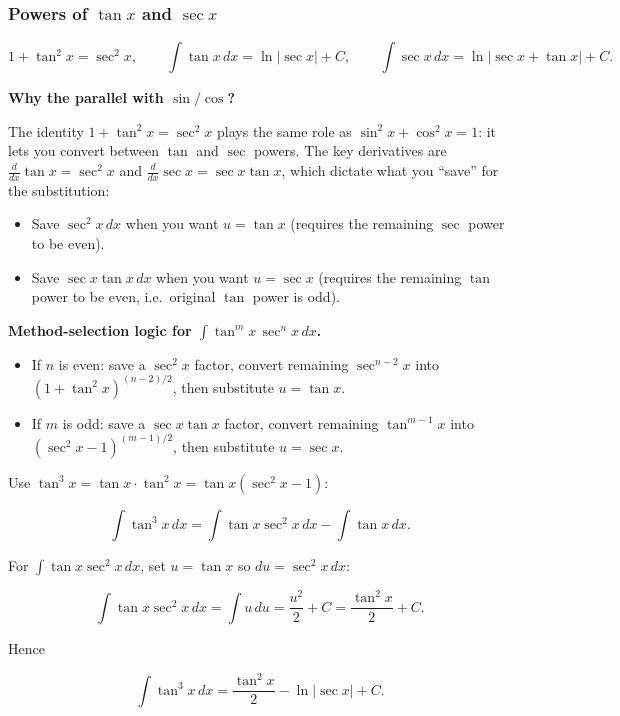 \subsubsection*{Powers of $\tan x$ and $\sec x$}

\begin{keyformula}[title={Key Formula: Core identity for $\tan/\sec$}]

\[
1+\tan^2x=\sec^2x,\qquad
\int \tan x\,dx=\ln|\sec x|+C,\qquad
\int \sec x\,dx=\ln|\sec x+\tan x|+C.
\]

\end{keyformula}

\textbf{Why the parallel with $\sin/\cos$?}

The identity $1+\tan^2x=\sec^2x$ plays the same role as $\sin^2x+\cos^2x=1$: it lets you convert between $\tan$ and $\sec$ powers. The key derivatives are $\frac{d}{dx}\tan x=\sec^2x$ and $\frac{d}{dx}\sec x=\sec x\tan x$, which dictate what you ``save'' for the substitution:

\begin{itemize}[leftmargin=*]
\item Save $\sec^2x\,dx$ when you want $u=\tan x$ (requires the remaining $\sec$ power to be even).
\item Save $\sec x\tan x\,dx$ when you want $u=\sec x$ (requires the remaining $\tan$ power to be even, i.e.\ original $\tan$ power is odd).
\end{itemize}

\noindent
\textbf{Method-selection logic for $\int \tan^m x\,\sec^n x\,dx$.}

\begin{itemize}
\item If $n$ is even: save a $\sec^2x$ factor, convert remaining $\sec^{n-2}x$ into $(1+\tan^2x)^{(n-2)/2}$, then substitute $u=\tan x$.
\item If $m$ is odd: save a $\sec x\tan x$ factor, convert remaining $\tan^{m-1}x$ into $(\sec^2x-1)^{(m-1)/2}$, then substitute $u=\sec x$.
\end{itemize}

\begin{examplebox}[title={Worked Example: $\displaystyle \int \tan^3x\,dx$ (reduce power)}]

Use $\tan^3x=\tan x\cdot \tan^2x=\tan x(\sec^2x-1)$:

\[
\int \tan^3x\,dx=\int \tan x\sec^2x\,dx-\int \tan x\,dx.
\]

For $\int \tan x\sec^2x\,dx$, set $u=\tan x$ so $du=\sec^2x\,dx$:

\[
\int \tan x\sec^2x\,dx=\int u\,du=\frac{u^2}{2}+C=\frac{\tan^2x}{2}+C.
\]

Hence

\[
\int \tan^3x\,dx=\frac{\tan^2x}{2}-\ln|\sec x|+C.
\]

\end{examplebox}

